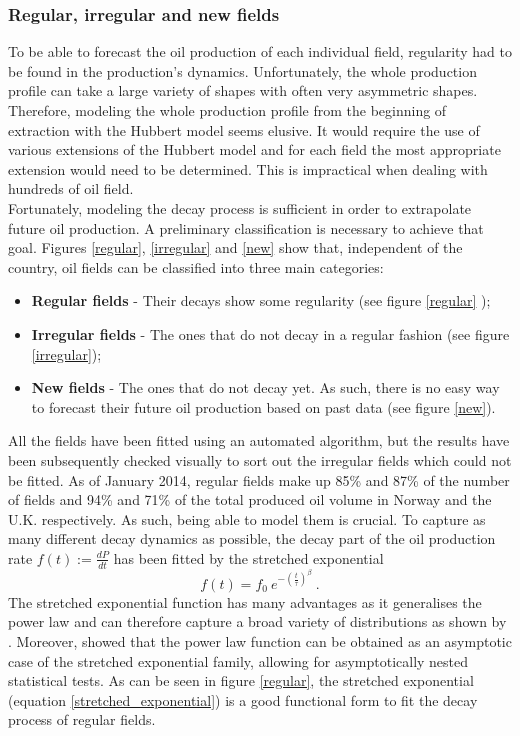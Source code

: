 \documentclass[review]{elsarticle}
\begin{document}
\subsubsection{Regular, irregular and new fields\label{sub:Regular,-irregular-and}}

To be able to forecast the oil production of each individual field,
regularity had to be found in the production's dynamics. Unfortunately, the whole production profile can take a large variety of shapes with often very asymmetric shapes. Therefore, modeling the whole production profile from the beginning of extraction with the Hubbert model seems elusive. It would require the use of various extensions of the Hubbert model and for each field the most appropriate extension would need to be determined. This is impractical when dealing with hundreds of oil field.\\
Fortunately, modeling the decay process is sufficient in order to extrapolate future oil production. A preliminary classification is necessary to achieve that goal. Figures \ref{regular}, \ref{irregular} and \ref{new} show that, independent of the country, oil fields can be classified into three main categories:
\begin{itemize}
\item \textbf{Regular fields} - Their decays show some regularity (see figure \ref{regular} ); 
\item \textbf{Irregular fields} - The ones that do not decay in a regular
fashion (see figure \ref{irregular});
\item \textbf{New fields} - The ones that do not decay yet. As such, there
is no easy way to forecast their future oil production based on past
data (see figure \ref{new}).
\end{itemize}
\noindent All the fields have been fitted using an automated algorithm,
but the results have been subsequently checked visually to sort out
the irregular fields which could not be fitted. As of January 2014,
regular fields make up 85\% and 87\% of the number of fields and 94\%
and 71\% of the total produced oil volume in Norway and the U.K. respectively.
As such, being able to model them is crucial. To capture as many different
decay dynamics as possible, the decay part of the oil production rate
$f(t) := \frac{dP}{dt}$ has been fitted by the stretched exponential  
\begin{equation}
f(t)=f_{0}~e^{-\left(\frac{t}{\tau}\right)^{\beta}}~.
\label{stretched_exponential}
\end{equation}
The stretched exponential function
has many advantages as it generalises the power law and can therefore
capture a broad variety of distributions as shown by \citet{Laherrere1998}. Moreover,
\citet{Malevergne2005} showed that the power law
function can be obtained as an asymptotic case of the stretched
exponential family, allowing for asymptotically nested statistical tests.  As can be seen
in figure \ref{regular}, the stretched exponential (equation \ref{stretched_exponential})
is a good functional form to fit the decay process of regular fields.
\end{document}
